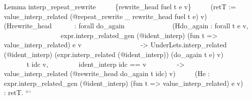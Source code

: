 \begin{itemize}
  Lemma interp\_repeat\_rewrite ~ ~ ~ \{rewrite\_head fuel t e v\} ~ ~ ~
  (retT := value\_interp\_related (@repeat\_rewrite \_ rewrite\_head
  fuel t e) v) ~ ~ ~ (Hrewrite\_head ~ ~ ~ ~: forall do\_again ~ ~ ~ ~ ~
  ~ ~ ~ (Hdo\_again : forall t e v, ~ ~ ~ ~ ~ ~ ~ ~ ~ ~
  expr.interp\_related\_gen (@ident\_interp) (fun t =\textgreater{}
  value\_interp\_related) e v ~ ~ ~ ~ ~ ~ ~ ~ ~ ~ -\textgreater{}
  UnderLets.interp\_related (@ident\_interp) (expr.interp\_related
  (@ident\_interp)) (do\_again t e) v) ~ ~ ~ ~ ~ ~ ~ ~ t idc v, ~ ~ ~ ~
  ~ ident\_interp idc == v ~ ~ ~ ~ ~ -\textgreater{}
  value\_interp\_related (@rewrite\_head do\_again t idc) v) ~ ~ ~ (He :
  expr.interp\_related\_gen (@ident\_interp) (fun t =\textgreater{}
  value\_interp\_related) e v) ~ : retT. ```
\end{itemize}

